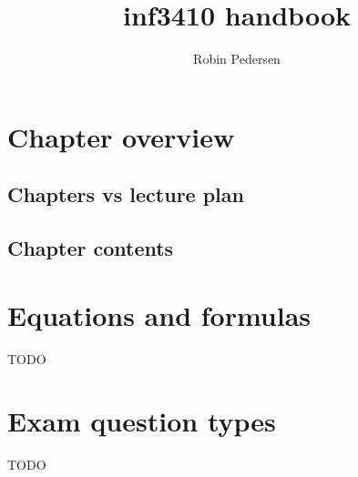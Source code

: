 \documentclass{article}
\begin{document}
  \title{inf3410 handbook}
  \author{Robin Pedersen}
  \maketitle
  \tableofcontents

  
  \section{Chapter overview}
    
    \subsection{Chapters vs lecture plan}
      
    \subsection{Chapter contents}
      
  \section{Equations and formulas}
    TODO
  \section{Exam question types}
    TODO
  \printindex
\end{document}
